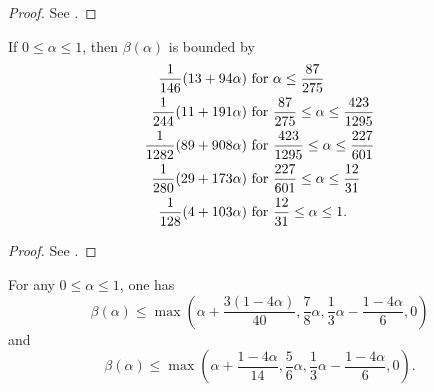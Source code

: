 \literature
{}

\begin{proof}
See \cite[Theorem~1]{huxley_exponential_1993}.
\end{proof}


\begin{theorem}\label{beta-Huxley-4a} If $0 \leq \alpha \leq 1$, then $\beta(\alpha)$ is bounded by
    \begin{align*}
        \frac{1}{146} (13+94\alpha) & \hbox{ for } \alpha \leq \frac{87}{275} \\
        \frac{1}{244} (11+191\alpha) & \hbox{ for } \frac{87}{275} \leq \alpha \leq \frac{423}{1295} \\
        \frac{1}{1282} (89+908\alpha) & \hbox{ for } \frac{423}{1295} \leq \alpha \leq \frac{227}{601} \\
        \frac{1}{280} (29+173\alpha) & \hbox{ for } \frac{227}{601} \leq \alpha \leq \frac{12}{31} \\
        \frac{1}{128} (4+103\alpha) & \hbox{ for } \frac{12}{31} \leq \alpha \leq 1.
    \end{align*}
\end{theorem}


\literature
{}

\begin{proof}
See \cite[Theorem~3]{huxley_exponential_1993}.
\end{proof}


\begin{theorem}\label{sargos_1995}\cite[Th\'eor\`eme 2.4, Lemme 2.6]{sargos_points_1995}  For any $0 \leq \alpha \leq 1$, one has
$$ \beta(\alpha) \leq \max\left(\alpha + \frac{3(1-4\alpha)}{40}, \frac{7}{8} \alpha, \frac{1}{3}\alpha - \frac{1-4\alpha}{6}, 0\right)$$
and
$$ \beta(\alpha) \leq \max\left(\alpha + \frac{1-4\alpha}{14}, \frac{5}{6} \alpha, \frac{1}{3}\alpha - \frac{1-4\alpha}{6}, 0\right).$$
\end{theorem}

\literature
{}

